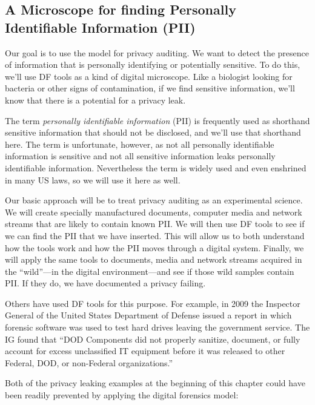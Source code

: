\subsection{A Microscope for finding Personally Identifiable Information (PII) }

Our goal is to use
the model for privacy auditing. We want to detect the presence of
information that is personally identifying or potentially
sensitive. To do this, we'll use DF tools as a kind of digital
microscope. Like a biologist looking for bacteria or other signs of
contamination, if we find sensitive information, we'll know that there is a potential
for a privacy leak.

The term \emph{personally identifiable
  information} (PII) is frequently used as shorthand sensitive
information that should not be disclosed, and we'll use that shorthand
here. The term is unfortunate, however, as not all personally identifiable information is
sensitive and not all sensitive information leaks personally
identifiable information. Nevertheless the term is widely used and
even enshrined in many US laws, so we will use it here as well.

Our basic approach will be to treat privacy auditing as an
experimental science. We will create specially manufactured documents,
computer media and network streams that are likely to contain known
PII. We will then use DF tools to see if we can find the PII that we
have inserted. This will allow us to both understand how the tools
work and how the PII moves through a digital system. Finally, we will
apply the same tools to documents, media and network streams acquired
in the ``wild''---in the digital environment---and see if those wild
samples contain PII. If they do, we have documented a privacy failing.

Others have used DF tools for this purpose. For example, in 2009 the
Inspector General of the United States Department of Defense issued a
report in which forensic software was used to test hard drives leaving
the government service. The IG found that ``DOD Components did not
properly sanitize, document, or fully account for excess unclassified
IT equipment before it was released to other Federal, DOD, or
non-Federal organizations.''\cite{D-2009-104}

Both of the privacy leaking examples at the beginning of this chapter
could have been readily prevented by applying the digital forensics
model:

